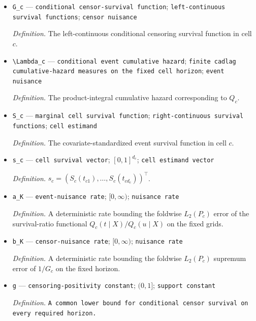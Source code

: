 \documentclass{article}
\begin{document}
\begin{itemize}
  \par\smallskip\noindent\emph{Definition.} The conditional survival function of the event time in cell \(c\).
  \item \texttt{G\_\allowbreak{}c} --- \texttt{conditional censor-\allowbreak{}survival function}; \texttt{left-\allowbreak{}continuous survival functions}; \texttt{censor nuisance}
  \par\smallskip\noindent\emph{Definition.} The left-continuous conditional censoring survival function in cell \(c\).
  \item \texttt{\textbackslash{}\allowbreak{}Lambda\_\allowbreak{}c} --- \texttt{conditional event cumulative hazard}; \texttt{finite cadlag cumulative-\allowbreak{}hazard measures on the fixed cell horizon}; \texttt{event nuisance}
  \par\smallskip\noindent\emph{Definition.} The product-integral cumulative hazard corresponding to \(Q_c\).
  \item \texttt{S\_\allowbreak{}c} --- \texttt{marginal cell survival function}; \texttt{right-\allowbreak{}continuous survival functions}; \texttt{cell estimand}
  \par\smallskip\noindent\emph{Definition.} The covariate-standardized event survival function in cell \(c\).
  \item \texttt{s\_\allowbreak{}c} --- \texttt{cell survival vector}; \([0,1]^{d_c}\); \texttt{cell estimand vector}
  \par\smallskip\noindent\emph{Definition.} \(s_c=(S_c(t_{c1}),\ldots,S_c(t_{cd_c}))^\top\).
  \item \texttt{a\_\allowbreak{}K} --- \texttt{event-\allowbreak{}nuisance rate}; \([0,\infty)\); \texttt{nuisance rate}
  \par\smallskip\noindent\emph{Definition.} A deterministic rate bounding the foldwise \(L_2(P_c)\) error of the survival-ratio functional \(Q_c(t\mid X)/Q_c(u\mid X)\) on the fixed grids.
  \item \texttt{b\_\allowbreak{}K} --- \texttt{censor-\allowbreak{}nuisance rate}; \([0,\infty)\); \texttt{nuisance rate}
  \par\smallskip\noindent\emph{Definition.} A deterministic rate bounding the foldwise \(L_2(P_c)\) supremum error of \(1/G_c\) on the fixed horizon.
  \item \texttt{g} --- \texttt{censoring-\allowbreak{}positivity constant}; \((0,1]\); \texttt{support constant}
  \par\smallskip\noindent\emph{Definition.} \texttt{A common lower bound for conditional censor survival on every required horizon.}

\end{itemize}
\end{document}
